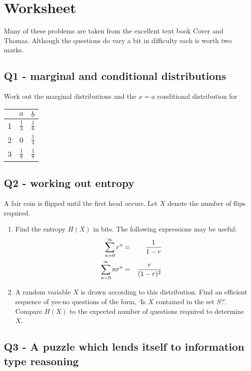 \documentclass[12pt]{article}
\begin{document}
\section*{Worksheet} 

Many of these problems are taken from the excellent text book Cover
and Thomas. Although the questions do vary a bit in difficulty each is
worth two marks. 

\subsection*{Q1 - marginal and conditional distributions}

Work out the marginal distributions and the $x=a$ conditional distribution for
\begin{center}
\begin{tabular}{c|cc}
&$a$&$b$\\
\hline
1&$\frac{1}{3}$&$\frac{1}{6}$\\
2&0&$\frac{1}{4}$\\
3&$\frac{1}{8}$&$\frac{1}{8}$
\end{tabular}
\end{center}

\subsection*{Q2 - working out entropy}

A fair coin is flipped until the first head occurs. Let $X$ denote the
number of flips required.
\begin{enumerate}
\item Find the entropy $H(X)$ in bits. The following expressions may be useful:\begin{eqnarray}
\sum_{n=0}^{\infty} r^n&=&\frac{1}{1-r}\cr
\sum_{n=0}^{\infty}nr^n&=&\frac{r}{(1-r)^2}
\end{eqnarray}
\item A random variable $X$ is drawn according to this distribution. Find an efficient sequence of yes-no questions of the form, \lq Is $X$ contained in the set $S$?\rq{}. Compare $H(X)$ to the expected number of questions required to determine $X$.
\end{enumerate}

\subsection*{Q3 - A puzzle which lends itself to information type reasoning}
\end{document}
